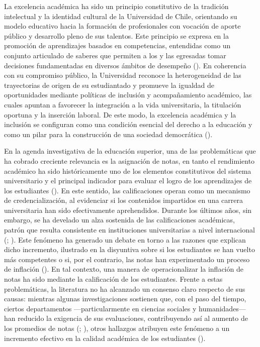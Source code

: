 \documentclass[
  spanish,
  a4paper,
  oneside]{scrbook}
\begin{document}
La excelencia académica ha sido un principio constitutivo de la
tradición intelectual y la identidad cultural de la Universidad de
Chile, orientando su modelo educativo hacia la formación de
profesionales con vocación de aporte público y desarrollo pleno de sus
talentos. Este principio se expresa en la promoción de aprendizajes
basados en competencias, entendidas como un conjunto articulado de
saberes que permiten a los y las egresadas tomar decisiones
fundamentadas en diversos ámbitos de desempeño
(). En coherencia con su compromiso público, la Universidad reconoce
la heterogeneidad de las trayectorias de origen de su estudiantado y
promueve la igualdad de oportunidades mediante políticas de inclusión y
acompañamiento académico, las cuales apuntan a favorecer la integración
a la vida universitaria, la titulación oportuna y la inserción laboral.
De este modo, la excelencia académica y la inclusión se configuran como
una condición esencial del derecho a la educación y como un pilar para
la construcción de una sociedad democrática
().

En la agenda investigativa de la educación superior, una de las
problemáticas que ha cobrado creciente relevancia es la asignación de
notas, en tanto el rendimiento académico ha sido históricamente uno de
los elementos constitutivos del sistema universitario y el principal
indicador para evaluar el logro de los aprendizajes de los estudiantes
(). En este
sentido, las calificaciones operan como un mecanismo de
credencialización, al evidenciar si los contenidos impartidos en una
carrera universitaria han sido efectivamente aprehendidos. Durante los
últimos años, sin embargo, se ha develado un alza sostenida de las
calificaciones académicas, patrón que resulta consistente en
instituciones universitarias a nivel internacional
(;
). Este fenómeno ha
generado un debate en torno a las razones que explican dicho incremento,
ilustrado en la disyuntiva sobre si los estudiantes se han vuelto más
competentes o si, por el contrario, las notas han experimentado un
proceso de inflación (). En tal contexto, una manera de operacionalizar la
inflación de notas ha sido mediante la calificación de los estudiantes.
Frente a estas problemáticas, la literatura no ha alcanzado un consenso
claro respecto de sus causas: mientras algunas investigaciones sostienen
que, con el paso del tiempo, ciertos departamentos ---particularmente en
ciencias sociales y humanidades--- han reducido la exigencia de sus
evaluaciones, contribuyendo así al aumento de los promedios de notas
(; ), otros hallazgos atribuyen este fenómeno a un incremento efectivo
en la calidad académica de los estudiantes
().
\end{document}
